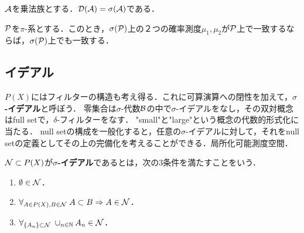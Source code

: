 \documentclass[uplatex, dvipdfmx]{jsreport}
\begin{document}
\begin{theorem}[Dynkin族定理]
    $\A$を乗法族とする．$\D(\A)=\sigma(\A)$である．
\end{theorem}

\begin{theorem}[一致の定理]
    $\P$を$\pi$-系とする．このとき，$\sigma(\P)$上の２つの確率測度$\mu_1,\mu_2$が$\P$上で一致するならば，$\sigma(\P)$上でも一致する．
\end{theorem}

\subsection{イデアル}

\begin{tcolorbox}[colframe=ForestGreen, colback=ForestGreen!10!white,breakable,colbacktitle=ForestGreen!40!white,coltitle=black,fonttitle=\bfseries\sffamily,
title=]
    $P(X)$にはフィルターの構造も考え得る．これに可算演算への閉性を加えて，\textbf{$\sigma$-イデアル}と呼ぼう．
    零集合は$\sigma$-代数$\B$の中で$\sigma$-イデアルをなし，その双対概念はfull setで，$\delta$-フィルターをなす．
    "small"と"large"という概念の代数的形式化に当たる．
    null setの構成を一般化すると，任意の$\sigma$-イデアルに対して，それをnull setの定義としてその上の完備化を考えることができる．局所化可能測度空間．
\end{tcolorbox}

\begin{definition}\label{def-sigma-ideal}
    $\cN\subset P(X)$が\textbf{$\sigma$-イデアル}であるとは，次の3条件を満たすことをいう．
    \begin{enumerate}
        \item $\emptyset\in\cN$．
        \item $\forall_{A\in P(X),B\in\cN}\;A\subset B\Rightarrow A\in\cN$．
        \item $\forall_{\{A_n\}\subset\cN}\;\cup_{n\in\N}A_n\in\cN$．
    \end{enumerate}
\end{definition}
\end{document}

